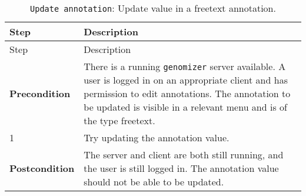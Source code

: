 \begin{longtable}[c]{@{}ll@{}}
\caption{\texttt{Update\ annotation}: Update value in a freetext
annotation.}\tabularnewline
\toprule
\begin{minipage}[b]{0.31\columnwidth}\raggedright\strut
Step
\strut\end{minipage} &
\begin{minipage}[b]{0.63\columnwidth}\raggedright\strut
Description
\strut\end{minipage}\tabularnewline
\midrule
\endfirsthead
\toprule
\begin{minipage}[b]{0.31\columnwidth}\raggedright\strut
Step
\strut\end{minipage} &
\begin{minipage}[b]{0.63\columnwidth}\raggedright\strut
Description
\strut\end{minipage}\tabularnewline
\midrule
\endhead
\begin{minipage}[t]{0.31\columnwidth}\raggedright\strut
\textbf{Precondition}
\strut\end{minipage} &
\begin{minipage}[t]{0.63\columnwidth}\raggedright\strut
There is a running \texttt{genomizer} server available. A user is logged
in on an appropriate client and has permission to edit annotations. The
annotation to be updated is visible in a relevant menu and is of the
type freetext.
\strut\end{minipage}\tabularnewline
\begin{minipage}[t]{0.31\columnwidth}\raggedright\strut
1
\strut\end{minipage} &
\begin{minipage}[t]{0.63\columnwidth}\raggedright\strut
Try updating the annotation value.
\strut\end{minipage}\tabularnewline
\begin{minipage}[t]{0.31\columnwidth}\raggedright\strut
\textbf{Postcondition}
\strut\end{minipage} &
\begin{minipage}[t]{0.63\columnwidth}\raggedright\strut
The server and client are both still running, and the user is still
logged in. The annotation value should not be able to be updated.
\strut\end{minipage}\tabularnewline
\bottomrule
\end{longtable}

